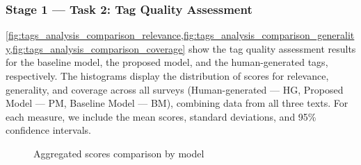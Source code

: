 \subsubsection{Stage 1 — Task 2: Tag Quality Assessment}
\cref{fig:tags_analysis_comparison_relevance,fig:tags_analysis_comparison_generality,fig:tags_analysis_comparison_coverage} show the tag quality assessment results for the baseline model, the proposed model, and the human-generated tags, respectively. The histograms display the distribution of scores for relevance, generality, and coverage across all surveys (Human-generated — HG, Proposed Model — PM, Baseline Model — BM), combining data from all three texts. For each measure, we include the mean scores, standard deviations, and 95\% confidence intervals.

\begin{figure}[h]
    \centering
    \hfill
    \hfill
    \caption{Aggregated scores comparison by model}
    \label{fig:tags_analysis_comparison}
\end{figure}

